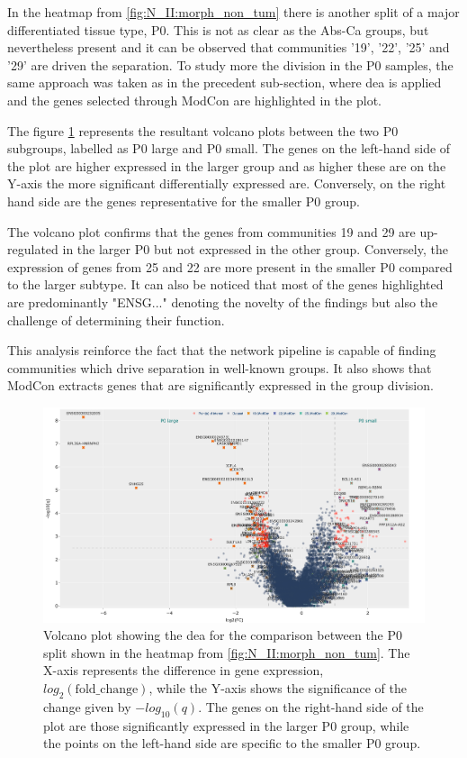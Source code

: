 In the heatmap from \cref{fig:N_II:morph_non_tum} there is another split of a major differentiated tissue type, P0. This is not as clear as the Abs-Ca groups, but nevertheless present and it can be observed that communities '19', '22', '25' and '29' are driven the separation. To study more the division in the P0 samples, the same approach was taken as in the precedent sub-section, where \acrshort{dea} is applied and the genes selected through ModCon are highlighted in the plot.

The figure \cref{fig:N_II:p0_split} represents the resultant volcano plots between the two P0 subgroups, labelled as P0 large and P0 small. The genes on the left-hand side of the plot are higher expressed in the larger group and as higher these are on the Y-axis the more significant differentially expressed are. Conversely, on the right hand side are the genes representative for the smaller P0 group.

The volcano plot confirms that the genes from communities 19 and 29 are up-regulated in the larger P0 but not expressed in the other group. Conversely, the expression of genes from 25 and 22 are more present in the smaller P0 compared to the larger subtype. It can also be noticed that most of the genes highlighted are predominantly "ENSG..." denoting the novelty of the findings but also the challenge of determining their function. 

This analysis reinforce the fact that the network pipeline is capable of finding communities which drive separation in well-known groups. It also shows that ModCon extracts genes that are significantly expressed in the group division.


\begin{figure}[H]    
    \centering
    \includegraphics[width=1.0\textwidth,height=1.0\textheight,keepaspectratio]{Sections/Network_II/resources/non_tum/p0_split_dea.png}
    \caption{Volcano plot showing the \acrfull{dea} for the comparison between the P0 split shown in the heatmap from \cref{fig:N_II:morph_non_tum}. The X-axis represents the difference in gene expression, $log_2(\text{fold\_change})$, while the Y-axis shows the significance of the change given by $-log_{10}(q)$. The genes on the right-hand side of the plot are those significantly expressed in the larger P0 group, while the points on the left-hand side are specific to the smaller P0 group.}
    \label{fig:N_II:p0_split}
\end{figure}




